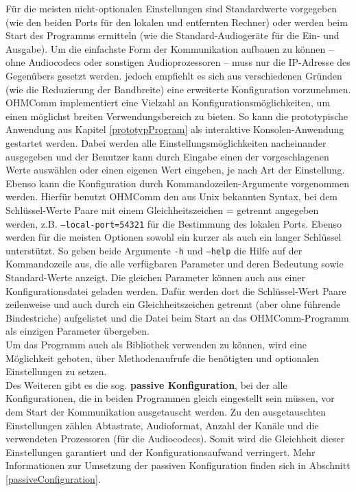 Für die meisten nicht-optionalen Einstellungen sind Standardwerte vorgegeben (wie den beiden Ports für den lokalen und entfernten Rechner) oder werden beim Start des Programms ermitteln (wie die Standard-Audiogeräte für die Ein- und Ausgabe). Um die einfachste Form der Kommunikation aufbauen zu können -- ohne Audiocodecs oder sonstigen Audioprozessoren -- muss nur die IP-Adresse des Gegenübers gesetzt werden. jedoch empfiehlt es sich aus verschiedenen Gründen (wie die Reduzierung der Bandbreite) eine erweiterte Konfiguration vorzunehmen.
\\%
OHMComm implementiert eine Vielzahl an Konfigurationsmöglichkeiten, um einen möglichst breiten Verwendungsbereich zu bieten. So kann die prototypische Anwendung aus Kapitel \ref{prototypProgram} als interaktive Konsolen-Anwendung gestartet werden. Dabei werden alle Einstellungsmöglichkeiten nacheinander ausgegeben und der Benutzer kann durch Eingabe einen der vorgeschlagenen Werte auswählen oder einen eigenen Wert eingeben, je nach Art der Einstellung.
\\
Ebenso kann die Konfiguration durch Kommandozeilen-Argumente vorgenommen werden. Hierfür benutzt OHMComm den aus Unix bekannten Syntax, bei dem Schlüssel-Werte Paare mit einem Gleichheitszeichen = getrennt angegeben werden, z.B. \texttt{--local-port=54321} für die Bestimmung des lokalen Ports. Ebenso werden für die meisten Optionen sowohl ein kurzer als auch ein langer Schlüssel unterstützt. So geben beide Argumente \texttt{-h} und \texttt{--help} die Hilfe auf der Kommandozeile aus, die alle verfügbaren Parameter und deren Bedeutung sowie Standard-Werte anzeigt. Die gleichen Parameter können auch aus einer Konfigurationsdatei geladen werden. Dafür werden dort die Schlüssel-Wert Paare zeilenweise und auch durch ein Gleichheitszeichen getrennt (aber ohne führende Bindestriche) aufgelistet und die Datei beim Start an das OHMComm-Programm als einzigen Parameter übergeben.
\\
Um das Programm auch als Bibliothek verwenden zu können, wird eine Möglichkeit geboten, über Methodenaufrufe die benötigten und optionalen Einstellungen zu setzen. %
\\
Des Weiteren gibt es die sog. \textbf{passive Konfiguration}, bei der alle Konfigurationen, die in beiden Programmen gleich eingestellt sein müssen, vor dem Start der Kommunikation ausgetauscht werden. Zu den ausgetauschten Einstellungen zählen Abtastrate, Audioformat, Anzahl der Kanäle und die verwendeten Prozessoren (für die Audiocodecs). Somit wird die Gleichheit dieser Einstellungen garantiert und der Konfigurationsaufwand verringert. Mehr Informationen zur Umsetzung der passiven Konfiguration finden sich in Abschnitt \ref{passiveConfiguration}.

